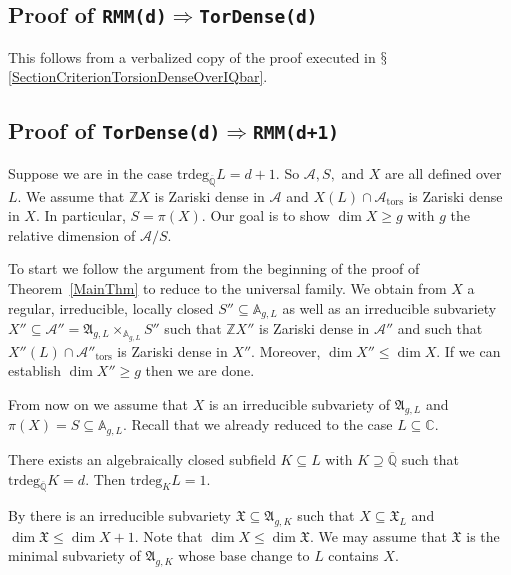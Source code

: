 \documentclass[12pt,oneside]{amsart}
\numberwithin{maincounter}{section}
\numberwithin{equation}{section}
\def\AA{\mathbb{A}}
\def\CC{\mathbb{C}}
\def\ZZ{\mathbb{Z}}
\def\QQ{\mathbb{Q}}
\newcommand{\cal}{\mathcal}
\newcommand{\cA}{\cal{A}}
\newcommand{\IC}{{\CC}}
\newcommand{\IQbar}{{\overline{\QQ}}}
\newcommand{\IZ}{{\ZZ}}
\newcommand{\IA}{{\AA}}
\renewcommand{\subset}{\subseteq} %
\renewcommand{\supset}{\supseteq}
\begin{document}
\subsection{Proof of {\tt RMM(d)}$\Rightarrow${\tt TorDense(d)}}
This follows from a verbalized copy of the proof executed in $\mathsection$\ref{SectionCriterionTorsionDenseOverIQbar}.%





\subsection{Proof of {\tt TorDense(d)}$\Rightarrow${\tt RMM(d+1)}}
Suppose we are in the case $\mathrm{trdeg}_{\IQbar} L = d+1$. So
$\cA,S,$ and $X$ are all defined over $L$. We assume that $\IZ X$ is
Zariski dense in $\cA$ and
$X(L)\cap\cA_{\mathrm{tors}}$ is Zariski dense in $X$. In particular,
$S=\pi(X)$.
Our goal is to
show $\dim X \ge g$ with $g$ the relative dimension of $\cA/S$.

To start we follow the argument from the beginning of the proof of
Theorem~\ref{MainThm} to reduce to the universal family.
We obtain from $X$ a regular, irreducible, locally closed $S''\subset\IA_{g,L}$
as well as an irreducible subvariety  $X''\subset
\cA''=\mathfrak{A}_{g,L}\times_{\IA_{g,L}} S''$
such that $\IZ X''$ is Zariski dense in $\cA''$
and such that $X''(L)\cap\cA''_{\mathrm{tors}}$ is Zariski dense in
$X''$. Moreover, $\dim X'' \le \dim X$. If we can establish $\dim
X''\ge g$ then we are done.

From now on we assume that $X$ is an irreducible  subvariety of
$\mathfrak{A}_{g,L}$ and $\pi(X) = S\subset\IA_{g,L}$. Recall that we
already reduced to the case $L\subset\IC$.

There exists an algebraically closed subfield $K \subseteq L$ with 
 $K\supset \IQbar$ such that $\mathrm{trdeg}_{\IQbar}K = d$. Then
$\mathrm{trdeg}_K L = 1$.

By \cite[Lemma~2.2]{BarDill} there is an irreducible  subvariety
$\mathfrak{X}\subset \mathfrak{A}_{g,K}$ such that $X\subset
\mathfrak{X}_L$ and $\dim \mathfrak X \le \dim X + 1$. Note that $\dim
X\le \dim\mathfrak X$. We may assume that $\mathfrak X$ is the
minimal subvariety of $\mathfrak{A}_{g,K}$ whose base change to $L$
contains $X$.
\end{document}
